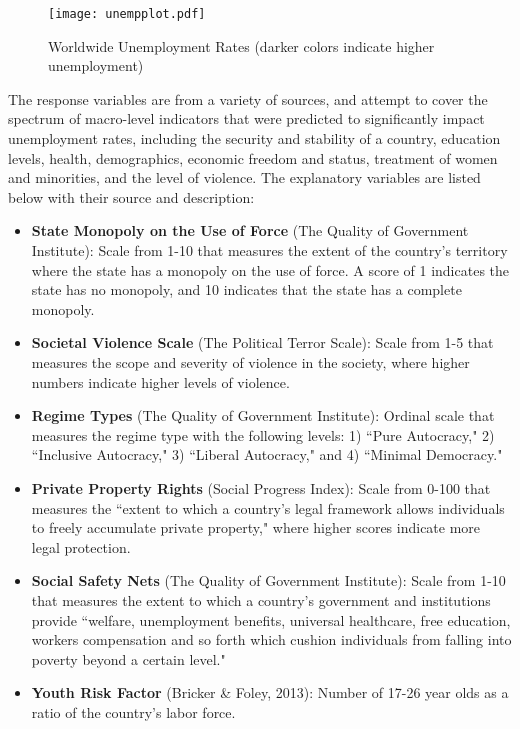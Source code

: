 \documentclass[letterpaper,11pt]{article}
\begin{document}
\begin{figure}
\centering
\texttt{[image: unempplot.pdf]}
\caption{Worldwide Unemployment Rates (darker colors indicate higher unemployment)}
\label{fig:unemp}
\end{figure}

The response variables are from a variety of sources, and attempt to cover the spectrum of macro-level indicators that were predicted to significantly impact unemployment rates, including the security and stability of a country, education levels, health, demographics, economic freedom and status, treatment of women and minorities, and the level of violence. The explanatory variables are listed below with their source and description:

\footnotesize
\begin{itemize}
\item \textbf{State Monopoly on the Use of Force} (The Quality of Government Institute): Scale from 1-10 that measures the extent of the country's territory where the state has a monopoly on the use of force. A score of 1 indicates the state has no monopoly, and 10 indicates that the state has a complete monopoly.
\item \textbf{Societal Violence Scale} (The Political Terror Scale): Scale from 1-5 that measures the scope and severity of violence in the society, where higher numbers indicate higher levels of violence.
\item \textbf{Regime Types} (The Quality of Government Institute): Ordinal scale that measures the regime type with the following levels: 1) ``Pure Autocracy," 2) ``Inclusive Autocracy," 3) ``Liberal Autocracy," and 4) ``Minimal Democracy."
\item \textbf{Private Property Rights} (Social Progress Index): Scale from 0-100 that measures the ``extent to which a country’s legal framework allows individuals to freely accumulate private property," where higher scores indicate more legal protection.
\item \textbf{Social Safety Nets} (The Quality of Government Institute): Scale from 1-10 that measures the extent to which a country's government and institutions provide ``welfare, unemployment benefits, universal healthcare, free education, workers compensation and so forth which cushion individuals from falling into poverty beyond a certain level."
\item \textbf{Youth Risk Factor} (Bricker \& Foley, 2013): Number of 17-26 year olds as a ratio of the country's labor force.

\end{itemize}
\end{document}
